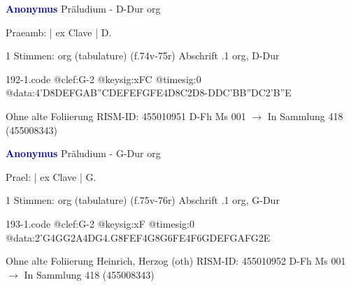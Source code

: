 \documentclass[twocolumn]{book}
\begin{document}
\newline \par \vspace{7pt} \textcolor{darkblue}{\textbf{Anonymus  }}
\newline Präludium - D-Dur
\newline org
\newline \begin{itshape}[f.74v, at left:] Praeamb: | ex Clave | D.\end{itshape} 
\newline \textcolor{darkblue}{}  1 Stimmen: org (tabulature)  (f.74v-75r)
\newline Abschrift
.1  org, D-Dur  
\begin{filecontents*}{192-1.code}
@clef:G-2
@keysig:xFC
@timesig:0
@data:4'D{8DE}{FGAB}{''CDEF}{EFGF}E4D8C2D8-{DDC}{'BB''DC}2'B''E
\end{filecontents*}
\newline
%
\newline Ohne alte Foliierung
\newline RISM-ID: 455010951
\newline D-Fh  Ms 001
\newline $\rightarrow$ In Sammlung 418 (455008343)
      
\newline \par \vspace{7pt} \textcolor{darkblue}{\textbf{Anonymus  }}
\newline Präludium - G-Dur
\newline org
\newline \begin{itshape}[f.75v, at left:] Prael: | ex Clave | G.\end{itshape} 
\newline \textcolor{darkblue}{}  1 Stimmen: org (tabulature)  (f.75v-76r)
\newline Abschrift
.1  org, G-Dur  
\begin{filecontents*}{193-1.code}
@clef:G-2
@keysig:xF
@timesig:0
@data:2'G4GG2A4DG4.G8F{EF}4G{8G6FE}4F{6GDEF}{GAFG}2E
\end{filecontents*}
\newline
%
\newline Ohne alte Foliierung
\newline Heinrich, Herzog  (oth)
\newline RISM-ID: 455010952
\newline D-Fh  Ms 001
\newline $\rightarrow$ In Sammlung 418 (455008343)
      
\end{document}
